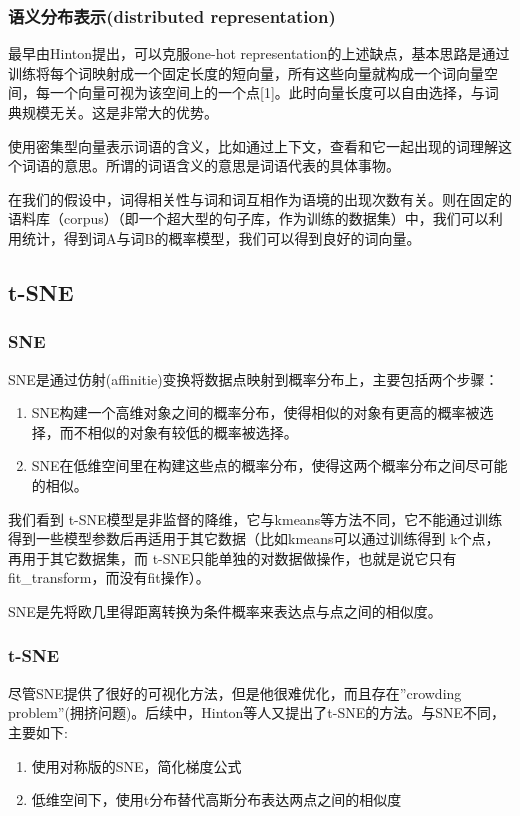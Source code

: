 \documentclass[12pt]{article}
\begin{document}
\subsubsection{语义分布表示(distributed representation)}
最早由Hinton提出，可以克服one-hot representation的上述缺点，基本思路是通过训练将每个词映射成一个固定长度的短向量，所有这些向量就构成一个词向量空间，每一个向量可视为该空间上的一个点[1]。此时向量长度可以自由选择，与词典规模无关。这是非常大的优势。\par
使用密集型向量表示词语的含义，比如通过上下文，查看和它一起出现的词理解这个词语的意思。所谓的词语含义的意思是词语代表的具体事物。\par
在我们的假设中，词得相关性与词和词互相作为语境的出现次数有关。则在固定的语料库（corpus）（即一个超大型的句子库，作为训练的数据集）中，我们可以利用统计，得到词A与词B的概率模型，我们可以得到良好的词向量。
\subsection{t-SNE}
	\subsubsection{SNE}
	SNE是通过仿射(affinitie)变换将数据点映射到概率分布上，主要包括两个步骤：
	\begin{enumerate}
	\item SNE构建一个高维对象之间的概率分布，使得相似的对象有更高的概率被选择，而不相似的对象有较低的概率被选择。
	\item SNE在低维空间里在构建这些点的概率分布，使得这两个概率分布之间尽可能的相似。
	\end{enumerate}
	
	 我们看到 t-SNE模型是非监督的降维，它与kmeans等方法不同，它不能通过训练得到一些模型参数后再适用于其它数据（比如kmeans可以通过训练得到 k个点，再用于其它数据集，而 t-SNE只能单独的对数据做操作，也就是说它只有fit\_transform，而没有fit操作）。
	 
	 SNE是先将欧几里得距离转换为条件概率来表达点与点之间的相似度。
	\subsubsection{t-SNE}
	尽管SNE提供了很好的可视化方法，但是他很难优化，而且存在”crowding problem”(拥挤问题)。后续中，Hinton等人又提出了t-SNE的方法。与SNE不同，主要如下:\par
	\begin{enumerate}
	\item 使用对称版的SNE，简化梯度公式
	\item 低维空间下，使用t分布替代高斯分布表达两点之间的相似度
	\end{enumerate}
	
\end{document}
